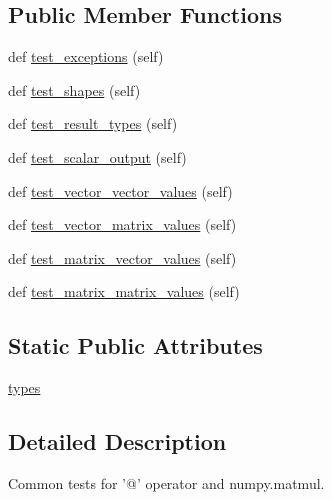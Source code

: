 \subsection*{Public Member Functions}
\begin{DoxyCompactItemize}
\item 
def \hyperlink{classnumpy_1_1core_1_1tests_1_1test__multiarray_1_1MatmulCommon_acb36c01a6a161bb1b0c6d47d0e4ecc6e}{test\+\_\+exceptions} (self)
\item 
def \hyperlink{classnumpy_1_1core_1_1tests_1_1test__multiarray_1_1MatmulCommon_a5ded11f9285195d1b966bc4416a66942}{test\+\_\+shapes} (self)
\item 
def \hyperlink{classnumpy_1_1core_1_1tests_1_1test__multiarray_1_1MatmulCommon_a183ceae456df2c3376fe7368b109bbcb}{test\+\_\+result\+\_\+types} (self)
\item 
def \hyperlink{classnumpy_1_1core_1_1tests_1_1test__multiarray_1_1MatmulCommon_a26fa52fbff2608a93f5f9f9a6786d57f}{test\+\_\+scalar\+\_\+output} (self)
\item 
def \hyperlink{classnumpy_1_1core_1_1tests_1_1test__multiarray_1_1MatmulCommon_aa44cbd1fe6e5478c2689b39df786cc5b}{test\+\_\+vector\+\_\+vector\+\_\+values} (self)
\item 
def \hyperlink{classnumpy_1_1core_1_1tests_1_1test__multiarray_1_1MatmulCommon_a4ceb5cf831af10dcd3c288ba0dd6a79a}{test\+\_\+vector\+\_\+matrix\+\_\+values} (self)
\item 
def \hyperlink{classnumpy_1_1core_1_1tests_1_1test__multiarray_1_1MatmulCommon_a14b8deddf413ff7229cf623224197d3d}{test\+\_\+matrix\+\_\+vector\+\_\+values} (self)
\item 
def \hyperlink{classnumpy_1_1core_1_1tests_1_1test__multiarray_1_1MatmulCommon_a3c8ab7feea658b5371eb0072fe83b446}{test\+\_\+matrix\+\_\+matrix\+\_\+values} (self)
\end{DoxyCompactItemize}
\subsection*{Static Public Attributes}
\begin{DoxyCompactItemize}
\item 
\hyperlink{classnumpy_1_1core_1_1tests_1_1test__multiarray_1_1MatmulCommon_adf62c0b0992298f48d454e472c367408}{types}
\end{DoxyCompactItemize}


\subsection{Detailed Description}
\begin{DoxyVerb}Common tests for '@' operator and numpy.matmul.\end{DoxyVerb}
 

